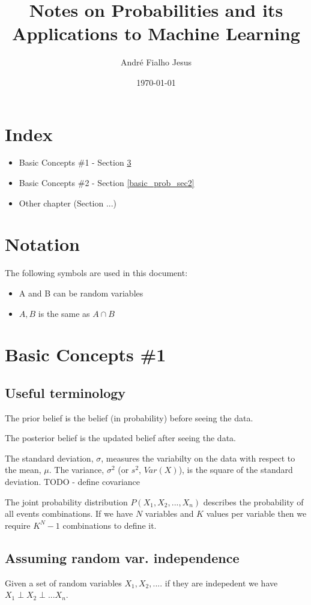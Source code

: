 \documentclass[12pt]{article}
\title{Notes on Probabilities and its Applications to Machine Learning}
\author{André Fialho Jesus}
\date{\today}
\begin{document}
\maketitle

\section{Index}
\begin{itemize}
    \item Basic Concepts \#1 - Section \ref{basic_prob_sec1}
    \item Basic Concepts \#2 - Section \ref{basic_prob_sec2}
    \item Other chapter (Section ...)
\end{itemize}

\section{Notation}
The following symbols are used in this document:
\begin{itemize}
    \item A and B can be random variables
    \item $A, B$ is the same as $A \cap B$ 
\end{itemize}


\section{Basic Concepts \#1}\label{basic_prob_sec1}


\subsection{Useful terminology}
The prior belief is the belief (in probability) before seeing the data.

The posterior belief is the updated belief after seeing the data.

The standard deviation, $\sigma$, measures the variabilty on the data with respect to the mean, $\mu$.
The variance, $\sigma^2$ (or $s^2$, $Var(X)$), is the square of the standard deviation.
TODO - define covariance  

The joint probability distribution $P(X_1, X_2, ..., X_n)$ describes the probability of all events combinations.
If we have $N$ variables and $K$ values per variable then we require $K^N-1$ combinations to define it.




\subsection{Assuming random var. independence}
Given a set of random variables $X_1, X_2, ....$ if they are indepedent we have $X_1 \perp X_2 \perp ... X_n$.
\end{document}
